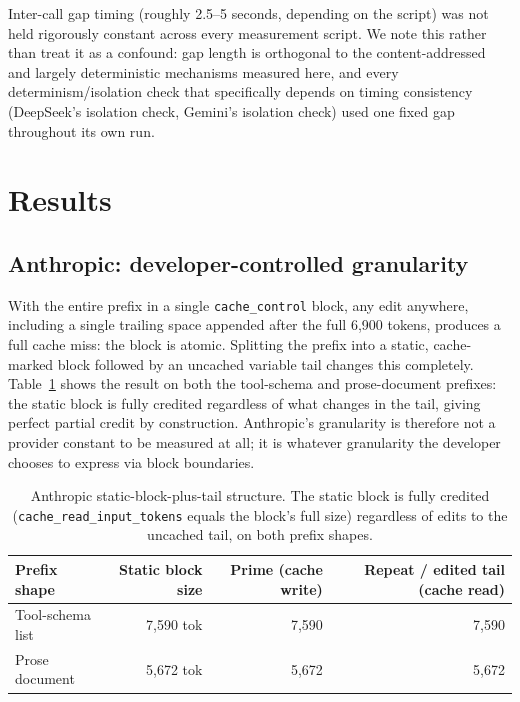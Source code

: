 \documentclass[11pt]{article}
\newcommand{\code}[1]{\texttt{#1}}
\begin{document}
Inter-call gap timing (roughly 2.5--5 seconds, depending on the script) was
not held rigorously constant across every measurement script. We note this
rather than treat it as a confound: gap length is orthogonal to the
content-addressed and largely deterministic mechanisms measured here, and
every determinism/isolation check that specifically depends on timing
consistency (DeepSeek's isolation check, Gemini's isolation check) used one
fixed gap throughout its own run.

\section{Results}
\label{sec:results}

\subsection{Anthropic: developer-controlled granularity}
\label{sec:anthropic}
With the entire prefix in a single \code{cache\_control} block, any edit
anywhere, including a single trailing space appended after the full 6,900
tokens, produces a full cache miss: the block is atomic. Splitting the
prefix into a static, cache-marked block followed by an uncached variable
tail changes this completely. Table~\ref{tab:anthropic} shows the result on
both the tool-schema and prose-document prefixes: the static block is fully
credited regardless of what changes in the tail, giving perfect partial
credit by construction. Anthropic's granularity is therefore not a provider
constant to be measured at all; it is whatever granularity the developer
chooses to express via block boundaries.

\begin{table}[t]
\centering
\caption{Anthropic static-block-plus-tail structure. The static block is
fully credited (\code{cache\_read\_input\_tokens} equals the block's full
size) regardless of edits to the uncached tail, on both prefix shapes.}
\label{tab:anthropic}
\begin{tabular}{@{}lrrr@{}}
\toprule
Prefix shape & Static block size & Prime (cache write) & Repeat / edited tail (cache read) \\
\midrule
Tool-schema list & 7,590 tok & 7,590 & 7,590 \\
Prose document    & 5,672 tok & 5,672 & 5,672 \\
\bottomrule
\end{tabular}
\end{table}
\end{document}
